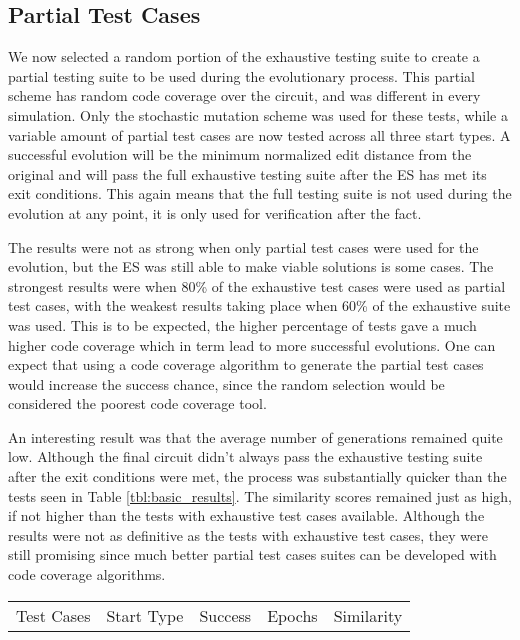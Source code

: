 \documentclass[conference]{IEEEtran}
\begin{document}
{\subsection{Partial Test Cases}
\par We now selected a random portion of the exhaustive testing suite to create a partial testing suite to be used during the evolutionary process.
This partial scheme has random code coverage over the circuit, and was different in every simulation.
Only the stochastic mutation scheme was used for these tests, while a variable amount of partial test cases are now tested across all three start types. 
A successful evolution will be the minimum normalized edit distance from the original and will pass the full exhaustive testing suite after the ES has met its exit conditions. 
This again means that the full testing suite is not used during the evolution at any point, it is only used for verification after the fact. 
\par The results were not as strong when only partial test cases were used for the evolution, but the ES was still able to make viable solutions is some cases.
The strongest results were when 80\% of the exhaustive test cases were used as partial test cases, with the weakest results taking place when 60\% of the exhaustive suite was used.
This is to be expected, the higher percentage of tests gave a much higher code coverage which in term lead to more successful evolutions.
One can expect that using a code coverage algorithm to generate the partial test cases would increase the success chance, since the random selection would be considered the poorest code coverage tool.
\par An interesting result was that the average number of generations remained quite low.
Although the final circuit didn't always pass the exhaustive testing suite after the exit conditions were met, the process was substantially quicker than the tests seen in Table \ref{tbl:basic_results}.
The similarity scores remained just as high, if not higher than the tests with exhaustive test cases available. 
Although the results were not as definitive as the tests with exhaustive test cases, they were still promising since much better partial test cases suites can be developed with code coverage algorithms.
\begin{table}
    \begin{tabular}[\textwidth]{||p{0.8cm}|p{2.2cm}|p{1cm}|p{1cm}|p{1cm}||}
         \hline
         Test Cases & Start Type & Success & Epochs & Similarity \\ [0.5ex] 

\end{tabular}
\end{table}}
\end{document}
